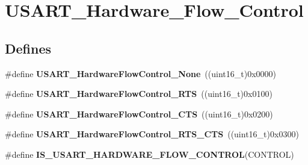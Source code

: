\hypertarget{group__USART__Hardware__Flow__Control}{
\section{USART\_\-Hardware\_\-Flow\_\-Control}
\label{group__USART__Hardware__Flow__Control}
}
\subsection*{Defines}
\begin{DoxyCompactItemize}
\item 
\hypertarget{group__USART__Hardware__Flow__Control_gaf3deaf4429b88db7753ee203f4797bd3}{
\#define {\bfseries USART\_\-HardwareFlowControl\_\-None}~((uint16\_\-t)0x0000)}
\label{group__USART__Hardware__Flow__Control_gaf3deaf4429b88db7753ee203f4797bd3}

\item 
\hypertarget{group__USART__Hardware__Flow__Control_ga22d4339693e3356d992abca259b0418e}{
\#define {\bfseries USART\_\-HardwareFlowControl\_\-RTS}~((uint16\_\-t)0x0100)}
\label{group__USART__Hardware__Flow__Control_ga22d4339693e3356d992abca259b0418e}

\item 
\hypertarget{group__USART__Hardware__Flow__Control_ga4d989f112f94009c0849fe4dbe829d81}{
\#define {\bfseries USART\_\-HardwareFlowControl\_\-CTS}~((uint16\_\-t)0x0200)}
\label{group__USART__Hardware__Flow__Control_ga4d989f112f94009c0849fe4dbe829d81}

\item 
\hypertarget{group__USART__Hardware__Flow__Control_ga2986aed8c6cba414ac8afe0180ab553e}{
\#define {\bfseries USART\_\-HardwareFlowControl\_\-RTS\_\-CTS}~((uint16\_\-t)0x0300)}
\label{group__USART__Hardware__Flow__Control_ga2986aed8c6cba414ac8afe0180ab553e}

\item 
\#define {\bfseries IS\_\-USART\_\-HARDWARE\_\-FLOW\_\-CONTROL}(CONTROL)
\end{DoxyCompactItemize}



